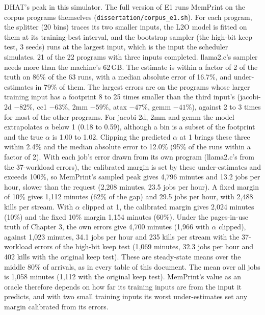 \documentclass[11pt]{article}
\newcommand{\memprint}{MemPrint}
\begin{document}
DHAT's peak in this simulator. The full version of E1 runs \memprint{} on the corpus programs themselves (\texttt{dissertation/corpus\_e1.sh}).
For each program, the splitter (20 bins) traces its two smaller inputs, the L2O model is fitted on them at its
training-best interval, and the bootstrap sampler (the high-bit keep test, 3 seeds) runs at the largest input, which
is the input the scheduler simulates. 21 of the 22 programs with three inputs completed. llama2.c's sampler needs
more than the machine's 62\,GB. The estimate is within a factor of 2 of the truth on 86\% of the 63 runs, with a
median absolute error of 16.7\%, and under-estimates in 79\% of them. The largest errors are on the programs whose
larger training input has a footprint 8 to 25 times smaller than the third input's (jacobi-2d $-82\%$, cc1 $-63\%$,
2mm $-59\%$, atax $-47\%$, gemm $-41\%$), against 2 to 3 times for most of the other programs. For jacobi-2d, 2mm and gemm the model extrapolates $\alpha$ below 1 (0.18 to 0.59),
although a bin is a subset of the footprint and the true $\alpha$ is 1.00 to 1.02. Clipping the predicted $\alpha$ at 1
brings these three within 2.4\% and the median absolute error to 12.0\% (95\% of the runs within a factor of 2).
With each job's error drawn from its own program (llama2.c's from the 37-workload errors), the calibrated margin is set
by these under-estimates and exceeds 100\%, so \memprint{}'s sampled peak gives 4{,}796 minutes and 13.2 jobs per
hour, slower than the request (2{,}208 minutes, 23.5 jobs per hour). A fixed margin of 10\% gives 1{,}112 minutes
(62\% of the gap) and 29.5 jobs per hour, with 2{,}488 kills per stream. With $\alpha$ clipped at 1, the calibrated
margin gives 2{,}024 minutes (10\%) and the fixed 10\% margin 1{,}154 minutes (60\%). Under the pages-in-use truth of
Chapter 3, the own errors give 4{,}700 minutes (1{,}966 with $\alpha$ clipped), against 1{,}023 minutes, 34.1 jobs
per hour and 235 kills per stream with the 37-workload errors of the high-bit keep test (1{,}069 minutes, 32.3 jobs per
hour and 402 kills with the original keep test). These are steady-state means over the middle 80\% of arrivals, as in
every table of this document. The mean over all jobs is 1{,}058 minutes (1{,}112 with the original keep test). \memprint{}'s value as an oracle therefore depends on how far its training inputs are from the input it
predicts, and with two small training inputs its worst under-estimates set any margin calibrated from its errors.
\end{document}
